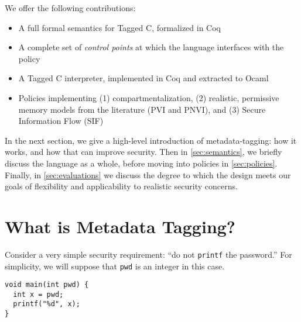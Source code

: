 \documentclass{llncs}
\begin{document}
We offer the following contributions:

\begin{itemize}
\item A full formal semantics for Tagged C, formalized in Coq
\item A complete set of {\em control points} at which the language interfaces with the policy
\item A Tagged C interpreter, implemented in Coq and extracted to Ocaml
\item Policies implementing (1) compartmentalization,
  (2) realistic, permissive memory models from the literature (PVI and PNVI),
  and (3) Secure Information Flow (SIF)
\end{itemize}

In the next section, we give a high-level introduction of metadata-tagging: how it works,
and how that can improve security. Then in \cref{sec:semantics}, we briefly discuss the
language as a whole, before moving into policies in \cref{sec:policies}. Finally, in
\cref{sec:evaluations} we discuss the degree to
which the design meets our goals of flexibility and applicability to realistic
security concerns.

\section{What is Metadata Tagging?}

  
Consider a very simple security requirement: ``do not {\tt printf} the password.''
For simplicity, we will suppose that {\tt pwd} is an integer in this case.

\vspace{\abovedisplayskip}
\begin{minipage}{0.4\textwidth}
\begin{verbatim}
void main(int pwd) {
  int x = pwd;
  printf("%d", x);
}
\end{verbatim}
\end{minipage}
\begin{minipage}{0.6\textwidth}
\end{minipage}
\vspace{\belowdisplayskip}
\end{document}
